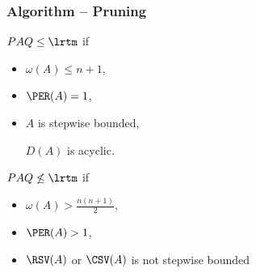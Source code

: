 \documentclass[unknownkeysallowed,11pt]{beamer}
\begin{document}
\begin{frame}
  \frametitle{Algorithm -- Pruning}

  $PAQ \leq \lrtm$ if
  \begin{itemize}
    \item
    $\omega(A) \leq n+1$,

    \medskip

    \item
    $\PER(A) = 1$,

    \medskip

    \item
    $A$ is stepwise bounded,

    \medskip

    $D(A)$ is acyclic.
  \end{itemize}

  \bigskip

  $PAQ \not\leq \lrtm$ if

  \begin{itemize}
    \item
    $\omega(A) > \frac{n(n+1)}{2}$,

    \medskip

    \item
    $\PER(A) > 1$,

    \medskip

    \item
     $\RSV(A)$ or $\CSV(A)$ is not stepwise bounded
  \end{itemize}
\end{frame}

\end{document}
